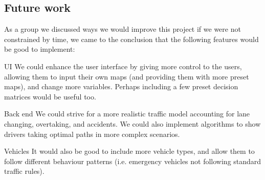 	\subsection{Future work}
		As a group we discussed ways we would improve this project if we were not constrained by time, we came to the conclusion that the following features would be good to implement:
        \begin{description}
        \item{UI} We could enhance the user interface by giving more control to the users, allowing them to input their own maps (and providing them with more preset maps), and change more variables. Perhaps including a few preset decision matrices would be useful too.
        \item{Back end} We could strive for a more realistic traffic model accounting for lane changing, overtaking, and accidents. We could also implement algorithms to show drivers taking optimal paths in more complex scenarios.
       	\item{Vehicles} It would also be good to include more vehicle types, and allow them to follow different behaviour patterns (i.e. emergency vehicles not following standard traffic rules).
        \end{description}
        